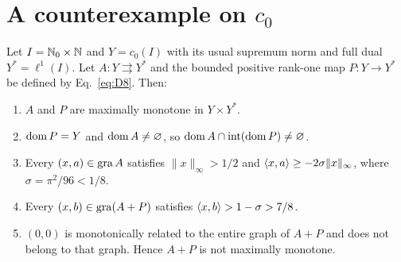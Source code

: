 \section{A counterexample on $c_0$}
\label{sec:c0}
\label{sec:statements}
\renewcommand{\thetheorem}{C}
\begin{theorem}[A counterexample on $c_0$]\label{thm:C}
Let $I=\mathbb N_0\times\mathbb N$ and $Y=c_0(I)$ with its usual supremum norm and
full dual $Y^*=\ell^1(I)$. Let $A:Y\rightrightarrows Y^*$ and the bounded
positive rank-one map $P:Y\to Y^*$ be defined by Eq.~\eqref{eq:D8}.
Then:
\begin{enumerate}
\item $A$ and $P$ are maximally monotone in $Y\times Y^*$.
\item $\operatorname{dom} P=Y$ and $\operatorname{dom} A\ne\varnothing$, so
$\operatorname{dom} A\cap\operatorname{int}(\operatorname{dom} P)\ne\varnothing$.
\item Every $(x,a)\in\operatorname{gra} A$ satisfies $\|x\|_\infty>1/2$ and
$\langle x,a\rangle\ge-2\sigma\|x\|_\infty$, where $\sigma=\pi^2/96<1/8$.
\item Every $(x,b)\in\operatorname{gra}(A+P)$ satisfies
$\langle x,b\rangle>1-\sigma>7/8$.
\item $(0,0)$ is monotonically related to the entire graph of $A+P$ and
does not belong to that graph. Hence $A+P$ is not maximally monotone.
\end{enumerate}
\end{theorem}
